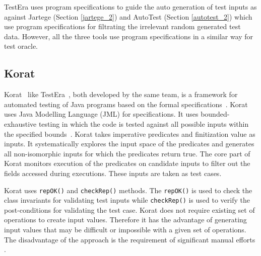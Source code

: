 TestEra uses program specifications to guide the auto generation of test inputs as against Jartege (Section \ref{jartege_2}) and AutoTest (Section \ref{autotest_2}) which use program specifications for filtrating the irrelevant random generated test data. However, all the three tools use program specifications in a similar way for test oracle. 



\subsection{Korat} %
Korat~\cite{boyapati2002korat} like TestEra~\cite{marinov2001testera}, both developed by the same team, is a framework for automated testing of Java programs based on the formal specifications~\cite{chang1999structural}. Korat uses Java Modelling Language (JML) for specifications. It uses bounded-exhaustive testing in which the code is tested against all possible inputs within the specified bounds~\cite{khurshid2001checking}. %
Korat takes imperative predicates and finitization value as inputs. It systematically explores the input space of the predicates and generates all non-isomorphic inputs for which the predicates return true. The core part of Korat monitors execution of the predicates on candidate inputs to filter out the fields accessed during executions. These inputs are taken as test cases. 

Korat uses \verb+repOK()+ and \verb+checkRep()+ methods. The \verb+repOK()+ is used to check the class invariants for validating test inputs while \verb+checkRep()+ is used to verify the post-conditions for validating the test case. Korat does not require existing set of operations to create input values. Therefore it has the advantage of generating input values that may be difficult or impossible with a given set of operations. The disadvantage of the approach is the requirement of significant manual efforts \cite{pacheco2009directed}.    

